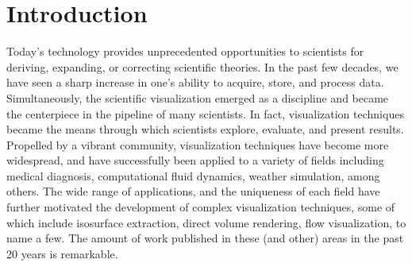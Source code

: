 \chapter{Introduction}

Today's technology provides unprecedented opportunities to scientists for deriving, expanding, or correcting scientific theories. In the past few decades, we have seen a sharp increase in one's ability to acquire, store, and process data. Simultaneously, the scientific visualization emerged as a discipline and became the centerpiece in the pipeline of many scientists. In fact, visualization techniques became the means through which scientists explore, evaluate, and present results. 
%
Propelled by a vibrant community, visualization techniques have become more widespread, and have successfully been applied to a variety of fields including medical diagnosis, computational fluid dynamics, weather simulation, among others. The wide range of applications, and the uniqueness of each field have further motivated the development of complex visualization techniques, some of which include isosurface extraction, direct volume rendering, flow visualization, to name a few.  
The amount of work published in these (and other) areas in the past 20 years is remarkable. 

